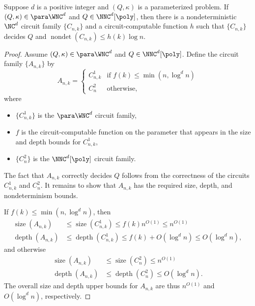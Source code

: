\documentclass{article}
\DeclareMathOperator{\depth}{depth}
\DeclareMathOperator{\nondet}{nondet}
\DeclareMathOperator{\size}{size}
\begin{document}
\begin{theorem}\label{thm:rmparam}
  Suppose $d$ is a positive integer and $(Q, \kappa)$ is a parameterized problem.
  If $(Q, \kappa) \in \para \WNC^d$ and $Q \in \NNC^d[\poly]$, then there is a nondeterministic $\NC^d$ circuit family $\{C_{n, k}\}$ and a circuit-computable function $h$ such that $\{C_{n, k}\}$ decides $Q$ and $\nondet(C_{n, k}) \leq h(k) \log n$.
\end{theorem}
\begin{proof}
  Assume $(Q, \kappa) \in \para \WNC^d$ and $Q \in \NNC^d[\poly]$.
  Define the circuit family $\{A_{n, k}\}$ by
  \[
  A_{n, k} =
  \begin{cases}
    C^1_{n, k} & \text{if } f(k) \leq \min(n, \log^d n) \\
    C^2_n & \text{otherwise},
  \end{cases}
  \]
  where
  \begin{itemize}
  \item $\{C^1_{n, k}\}$ is the $\para \WNC^d$ circuit family,
  \item $f$ is the circuit-computable function on the parameter that appears in the size and depth bounds for $C^1_{n, k}$,
  \item $\{C^2_n\}$ is the $\NNC^d[\poly]$ circuit family.
  \end{itemize}
  The fact that $A_{n, k}$ correctly decides $Q$ follows from the correctness of the circuits $C^1_{n, k}$ and $C^2_n$.
  It remains to show that $A_{n, k}$ has the required size, depth, and nondeterminism bounds.

  If $f(k) \leq \min(n, \log^d n)$, then
  \begin{align*}
    \size(A_{n, k}) & \leq \size(C^1_{n, k}) \leq f(k) n^{O(1)} \leq n^{O(1)} \\
    \depth(A_{n, k}) & \leq \depth(C^1_{n, k}) \leq f(k) + O(\log^d n) \leq O(\log^d n),
  \end{align*}
  and otherwise
  \begin{align*}
    \size(A_{n, k}) & \leq \size(C^2_n) \leq n^{O(1)} \\
    \depth(A_{n, k}) & \leq \depth(C^2_n) \leq O(\log^d n).
  \end{align*}
  The overall size and depth upper bounds for $A_{n, k}$ are thus $n^{O(1)}$ and $O(\log^d n)$, respectively.


\end{proof}
\end{document}
